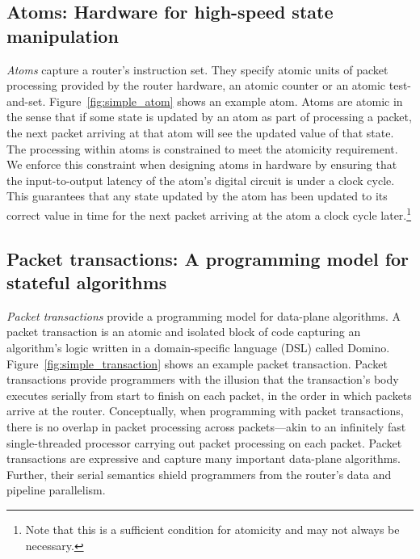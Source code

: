 \subsection{Atoms: Hardware for high-speed state manipulation}
\label{ss:intro_atoms}
\textit{Atoms} capture a router's instruction set. They specify atomic units of
packet processing provided by the router hardware, \eg an atomic counter or an
atomic test-and-set. Figure~\ref{fig:simple_atom} shows an example atom. Atoms
are atomic in the sense that if some state is updated by an atom as part of
processing a packet, the next packet arriving at that atom will see the updated
value of that state. The processing within atoms is constrained to meet the
atomicity requirement. We enforce this constraint when designing atoms in
hardware by ensuring  that the input-to-output latency of the atom's digital
circuit is under a clock cycle. This guarantees that any state updated by the
atom has been updated to its correct value in time for the next packet arriving
at the atom a clock cycle later.\footnote{Note that this is a sufficient
condition for atomicity and may not always be necessary.}

\subsection{Packet transactions: A programming model for stateful algorithms}

\textit{Packet transactions} provide a
programming model for data-plane algorithms. A packet transaction is an atomic
and isolated block of code capturing an algorithm's logic written in a
domain-specific language (DSL) called Domino.
Figure~\ref{fig:simple_transaction} shows an example packet transaction.
Packet transactions provide programmers with the illusion that the
transaction's body executes serially from start to finish on each packet, in
the order in which packets arrive at the router. Conceptually, when programming
with packet transactions, there is no overlap in packet processing across
packets---akin to an infinitely fast single-threaded processor carrying out
packet processing on each packet. Packet transactions are expressive and
capture many important data-plane algorithms.  Further, their serial semantics
shield programmers from the router's data and pipeline parallelism.

